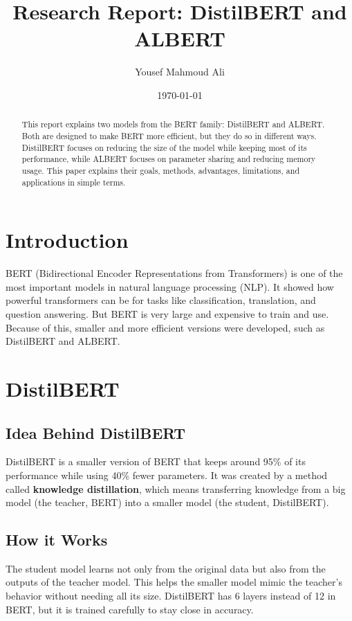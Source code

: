 \documentclass[11pt]{article}
\title{Research Report: DistilBERT and ALBERT}
\author{Yousef Mahmoud Ali}
\date{\today}
\begin{document}
\maketitle

\begin{abstract}
This report explains two models from the BERT family: DistilBERT and ALBERT. 
Both are designed to make BERT more efficient, but they do so in different ways. 
DistilBERT focuses on reducing the size of the model while keeping most of its performance, 
while ALBERT focuses on parameter sharing and reducing memory usage. 
This paper explains their goals, methods, advantages, limitations, and applications in simple terms.
\end{abstract}

\section{Introduction}
BERT (Bidirectional Encoder Representations from Transformers) is one of the most important models in natural language processing (NLP). 
It showed how powerful transformers can be for tasks like classification, translation, and question answering. 
But BERT is very large and expensive to train and use. 
Because of this, smaller and more efficient versions were developed, such as DistilBERT and ALBERT.

\section{DistilBERT}
\subsection{Idea Behind DistilBERT}
DistilBERT is a smaller version of BERT that keeps around 95\% of its performance while using 40\% fewer parameters. 
It was created by a method called \textbf{knowledge distillation}, which means transferring knowledge from a big model (the teacher, BERT) into a smaller model (the student, DistilBERT).

\subsection{How it Works}
The student model learns not only from the original data but also from the outputs of the teacher model. 
This helps the smaller model mimic the teacher’s behavior without needing all its size. 
DistilBERT has 6 layers instead of 12 in BERT, but it is trained carefully to stay close in accuracy.
\end{document}
